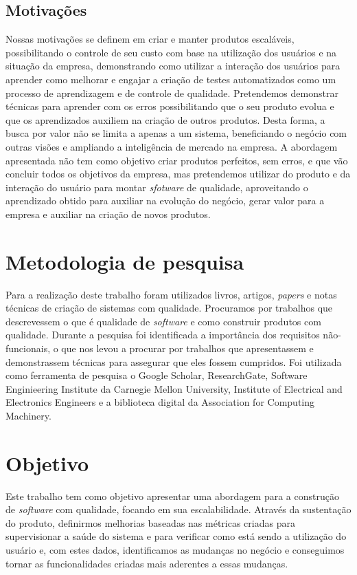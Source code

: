     \section{Motivações}
      Nossas motivações se definem em criar e manter produtos escaláveis,
      possibilitando o controle de seu custo com base na utilização
      dos usuários e na situação da empresa, demonstrando como utilizar a interação
      dos usuários para aprender como melhorar e engajar a criação de testes
      automatizados como um processo de aprendizagem e de controle de qualidade. \newline
      Pretendemos demonstrar técnicas para aprender com os erros possibilitando
      que o seu produto evolua e que os aprendizados auxiliem na criação de outros
      produtos. Desta forma, a busca por valor não se limita a apenas a um sistema,
      beneficiando o negócio com outras visões e ampliando a inteligência de mercado
      na empresa. A abordagem apresentada não tem como objetivo criar produtos perfeitos,
      sem erros, e que vão concluir todos os objetivos da empresa, mas pretendemos
      utilizar do produto e da interação do usuário para montar \textit{sfotware}
      de qualidade, aproveitando o aprendizado obtido para auxiliar na evolução
      do negócio, gerar valor para a empresa e auxiliar na criação de novos produtos.

  \chapter{Metodologia de pesquisa}
    Para a realização deste trabalho foram utilizados livros, artigos, \textit{papers}
    e notas técnicas de criação de sistemas com qualidade. Procuramos por trabalhos
    que descrevessem o que é qualidade de \textit{software} e como construir
    produtos com qualidade. Durante a pesquisa foi identificada a importância dos
    requisitos não-funcionais, o que nos levou a procurar por trabalhos que
    apresentassem e demonstrassem técnicas para assegurar que eles fossem
    cumpridos. \newline
    Foi utilizada como ferramenta de pesquisa o Google Scholar, ResearchGate,
    Software Enginieering Institute da Carnegie Mellon University, Institute of
    Electrical and Electronics Engineers e a biblioteca digital da Association
    for Computing Machinery.

  \chapter{Objetivo}
    Este trabalho tem como objetivo apresentar uma abordagem para a construção de
    \textit{software} com qualidade, focando em sua escalabilidade. Através da
    sustentação do produto, definirmos melhorias baseadas nas métricas criadas
    para supervisionar a saúde do sistema e para verificar como está sendo a
    utilização do usuário e, com estes dados, identificamos as mudanças no negócio
    e conseguimos tornar as funcionalidades criadas mais aderentes a essas mudanças.
